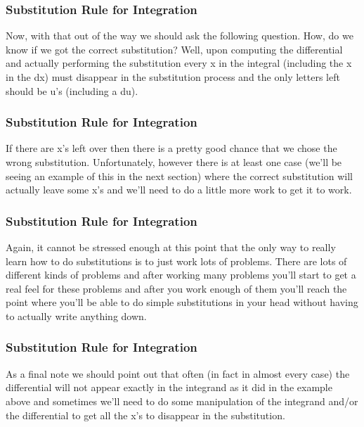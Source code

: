 \documentclass{beamer}
\begin{document}
\begin{frame}
	\frametitle{Substitution Rule for Integration}
	\large
	
Now, with that out of the way we should ask the following question.  How, do we know if we got the correct substitution?  Well, upon computing the differential and actually performing the substitution every x in the integral (including the x in the dx) must disappear in the substitution process and the only letters left should be u’s (including a du). 
\end{frame}
\begin{frame}
	\frametitle{Substitution Rule for Integration}
	\large If there are x’s left over then there is a pretty good chance that we chose the wrong substitution.  Unfortunately, however there is at least one case (we’ll be seeing an example of this in the next section) where the correct substitution will actually leave some x’s and we’ll need to do a little more work to get it to work. 
\end{frame}
\begin{frame}
	\frametitle{Substitution Rule for Integration}
	\large
Again, it cannot be stressed enough at this point that the only way to really learn how to do substitutions is to just work lots of problems. There are lots of different kinds of problems and after working many problems you’ll start to get a real feel for these problems and after you work enough of them you’ll reach the point where you’ll be able to do simple substitutions in your head without having to actually write anything down.
\end{frame}
\begin{frame}
	\frametitle{Substitution Rule for Integration}
	\large
As a final note we should point out that often (in fact in almost every case) the differential will not appear exactly in the integrand as it did in the example above and sometimes we’ll need to do some manipulation of the integrand and/or the differential to get all the x’s to disappear in the substitution.
\end{frame}
\end{document}
